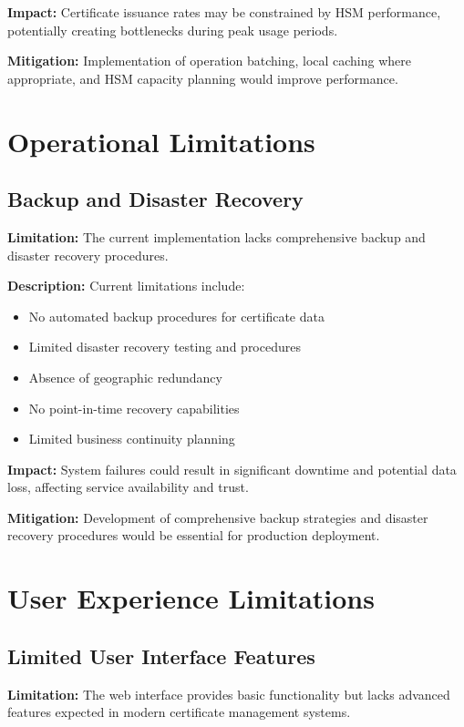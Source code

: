 \textbf{Impact:} Certificate issuance rates may be constrained by HSM performance, potentially creating bottlenecks during peak usage periods.

\textbf{Mitigation:} Implementation of operation batching, local caching where appropriate, and HSM capacity planning would improve performance.

\section{Operational Limitations}

\subsection{Backup and Disaster Recovery}

\textbf{Limitation:} The current implementation lacks comprehensive backup and disaster recovery procedures.

\textbf{Description:} Current limitations include:
\begin{itemize}
    \item No automated backup procedures for certificate data
    \item Limited disaster recovery testing and procedures
    \item Absence of geographic redundancy
    \item No point-in-time recovery capabilities
    \item Limited business continuity planning
\end{itemize}

\textbf{Impact:} System failures could result in significant downtime and potential data loss, affecting service availability and trust.

\textbf{Mitigation:} Development of comprehensive backup strategies and disaster recovery procedures would be essential for production deployment.

\section{User Experience Limitations}

\subsection{Limited User Interface Features}

\textbf{Limitation:} The web interface provides basic functionality but lacks advanced features expected in modern certificate management systems.

